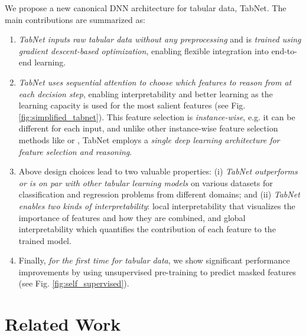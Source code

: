 We propose a new canonical DNN architecture for tabular data, TabNet.
The main contributions are summarized as:
\begin{enumerate}[noitemsep, nolistsep, leftmargin=*]
\item \emph{TabNet inputs raw tabular data without any preprocessing} and is \emph{trained using gradient descent-based optimization}, enabling flexible integration into end-to-end learning. 
\item \emph{TabNet uses sequential attention to choose which features to reason from at each decision step}, enabling interpretability and better learning as the learning capacity is used for the most salient features (see Fig. \ref{fig:simplified_tabnet}). 
This feature selection is \emph{instance-wise}, e.g. it can be different for each input, and unlike other instance-wise feature selection methods like \citep{l2x} or \citep{invase}, TabNet employs a \emph{single deep learning architecture for feature selection and reasoning}. 
\item Above design choices lead to two valuable properties: (i) \emph{TabNet outperforms or is on par with other tabular learning models} on various datasets for classification and regression problems from different domains; and (ii) \emph{TabNet enables two kinds of interpretability}: local interpretability that visualizes the importance of features and how they are combined, and global interpretability which quantifies the contribution of each feature to the trained model. 
\item Finally, \emph{for the first time for tabular data}, we show significant performance improvements by using unsupervised pre-training to predict masked features (see Fig. \ref{fig:self_supervised}). 

\end{enumerate}

\section{Related Work}

